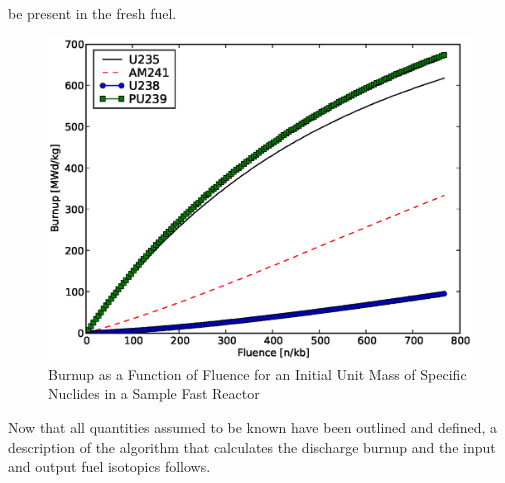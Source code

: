 be present in the fresh fuel.
\begin{figure}[htbp]
\caption{Burnup as a Function of Fluence for an Initial Unit Mass of Specific Nuclides in a Sample Fast Reactor}
\label{1g_fig03}
\begin{center}
\includegraphics[scale=0.5]{one_group_method/figs/Fig03.eps}
\end{center}
\end{figure}
Now that all quantities assumed to be known have been outlined and defined, a description of the 
algorithm that calculates the discharge burnup and the input and output fuel isotopics follows.   




